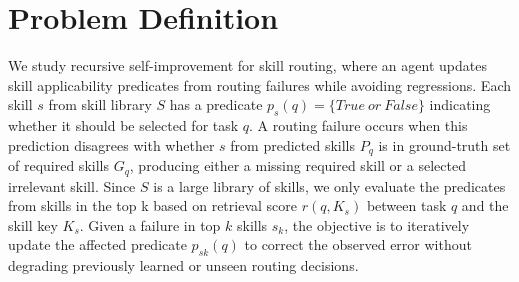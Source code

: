 
\section{Problem Definition}

We study recursive self-improvement for skill routing, where an agent updates skill applicability predicates from routing failures while avoiding regressions. Each skill \(s\) from skill library \(S\) has a predicate \(p_{s}(q) = \{ True\ or\ False\}\) indicating whether it should be selected for task \(q\). A routing failure occurs when this prediction disagrees with whether \(s\) from predicted skills \(P_{q}\) is in ground-truth set of required skills \(G_{q}\), producing either a missing required skill or a selected irrelevant skill. Since \(S\) is a large library of skills, we only evaluate the predicates from skills in the top k based on retrieval score \(r(q,K_{s})\) between task \(q\) and the skill key \(K_{s}\). Given a failure in top \(k\) skills \(s_{k}\), the objective is to iteratively update the affected predicate \(p_{sk}(q)\) to correct the observed error without degrading previously learned or unseen routing decisions.

